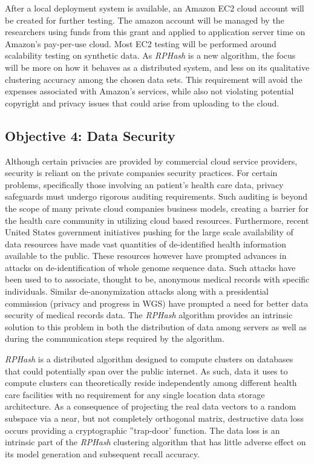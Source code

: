 \documentclass[a4paper,10pt]{article}
\begin{document}
After a local deployment system is available, an Amazon EC2 cloud account will
be created for further testing.  The amazon account will be managed by the
researchers using funds from this grant and applied to application server
time on Amazon's pay-per-use cloud.  Most EC2 testing will be performed
around scalability testing on synthetic data.  As \emph{RPHash} is a new
algorithm, the focus will be more on how it behaves as a distributed system,
and less on its qualitative clustering accuracy among the chosen data sets.
This requirement will avoid the expenses associated with Amazon's services,
while also not violating potential copyright and privacy issues that could
arise from uploading to the cloud.


\subsection{Objective 4: Data Security} Although certain privacies are provided
by commercial cloud service providers, security is reliant on the private
companies security practices.  For certain problems, specifically those
involving an patient's health care data, privacy safeguards must undergo
rigorous auditing requirements.  Such auditing is beyond the scope of many
private cloud companies business models, creating a barrier for the health
care community in utilizing cloud based resources.  Furthermore, recent United
States government initiatives pushing for the large scale availability of
data resources have made vast quantities of de-identified health information
available to the public.  These resources however have prompted advances in
attacks on de-identification of whole genome sequence data.  Such attacks
have been used to to associate, thought to be, anonymous medical records
with specific individuals\cite{deident}.  Similar de-anonymization attacks
\cite{deanon1,deanon2} along with a presidential commission (privacy and
progress in WGS) have prompted a need for better data security of medical
records data.  The \emph{RPHash} algorithm provides an intrinsic solution
to this problem in both the distribution of data among servers as well as
during the communication steps required by the algorithm.

\emph{RPHash} is a distributed algorithm designed to compute clusters on
databases that could potentially span over the public internet.
 As such, data it uses to
compute clusters can theoretically reside independently among different health
care facilities with no requirement for any single location data storage
architecture.  As a consequence of projecting the real data vectors to a
random subspace via a near, but not completely orthogonal matrix, destructive
data loss occurs providing a cryptographic ''trap-door' function.  The data
loss is an intrinsic part of the \emph{RPHash} clustering algorithm that has
little adverse effect on its model generation and subsequent recall accuracy.
\end{document}
